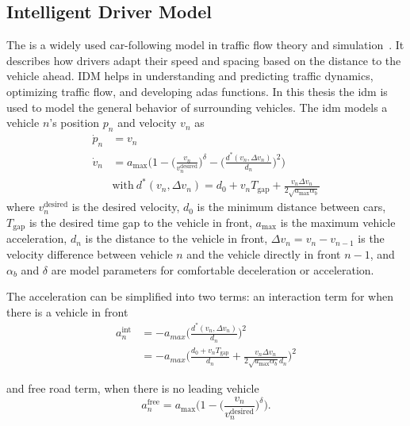 \subsection{Intelligent Driver Model}
\label{ch:idm}
The  is a widely used car-following model in traffic flow theory and simulation~\cite{idm2000}. It describes how drivers adapt their speed and spacing based on the distance to the vehicle ahead. IDM helps in understanding and predicting traffic dynamics, optimizing traffic flow, and developing \gls{adas} functions. In this thesis the \gls{idm} is used to model the general behavior of surrounding vehicles.
The \gls{idm} models a vehicle $n$'s position $p_n$ and velocity $v_n$ as
\begin{align}
    \dot p_n & = v_n\\
    \dot v_n & = a_{\mathrm{max}}\Big(1-\Big(\frac{v_n}{v^\mathrm{desired}_n}\Big)^\delta-\Big( \frac{d^*(v_n,\Delta v_n)}{d_n}\Big)^2\Big) \label{eq:idm} \\
    & \mathrm{with ~} d^*(v_n, \Delta v_n) = d_0 + v_n T_{\mathrm{gap}} + \frac{v_n \Delta v_n}{2 \sqrt{a_{\mathrm{max}} \alpha_b}} \nonumber
\end{align}
where $v^\mathrm{desired}_n$ is the desired velocity, $d_0$ is the minimum distance between cars, $T_{\mathrm{gap}}$ is the desired time gap to the vehicle in front, $a_\mathrm{max}$ is the maximum vehicle acceleration, $d_n$ is the distance to the vehicle in front, $\Delta v_n = v_n - v_{n-1}$ is the velocity difference between vehicle $n$ and the vehicle directly in front $n-1$, and $\alpha_b$ and $\delta$ are model parameters for comfortable deceleration or acceleration.

The acceleration can be simplified into two terms: an interaction term for when there is a vehicle in front 
\begin{align}
     a^\text{int}_n &=  -a_{max} \Big(\frac{d^*(v_n,\Delta v_n)}{d_n} \Big) ^2  \nonumber \\
     &= -a_{max} \Big(\frac{d_0 + v_n T_{\mathrm{gap}}}{d_n} + \frac{v_n \Delta v_n}{2 \sqrt{a_{\mathrm{max}} \alpha_b} d_n} \Big) ^2
     \label{eq:idm_int}
\end{align}

and free road term, when there is no leading vehicle
\begin{equation}
    a^\text{free}_n= a_\mathrm{max}\Big(1-\Big(\frac{v_n}{v^\mathrm{desired}_n}\Big)^\delta\Big).
    \label{eq:idm_free}
\end{equation}


